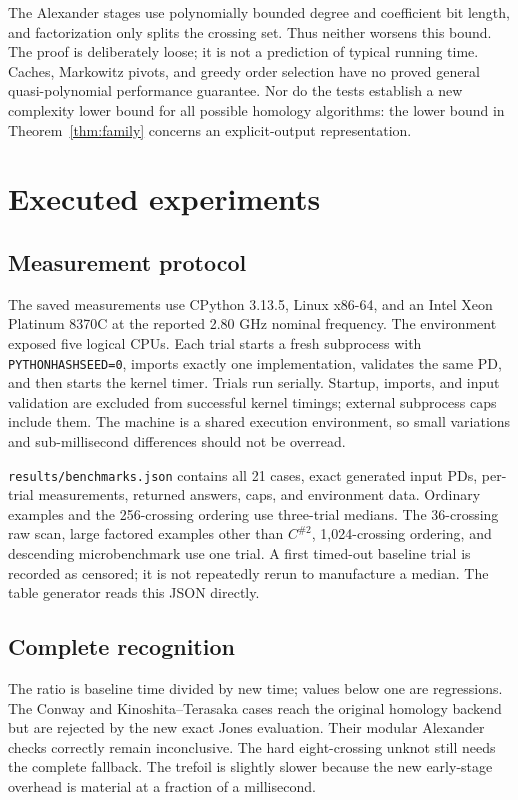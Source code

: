 \documentclass[11pt]{article}
\theoremstyle{definition}\newtheorem{definition}[theorem]{Definition}
\theoremstyle{remark}\newtheorem{remark}[theorem]{Remark}
\begin{document}
The Alexander stages use polynomially bounded degree and coefficient bit
length, and factorization only splits the crossing set. Thus neither worsens
this bound. The proof is deliberately loose; it is not a prediction of typical
running time. Caches, Markowitz pivots, and greedy order selection have no proved
general quasi-polynomial performance guarantee. Nor do the tests establish a
new complexity lower bound for all possible homology algorithms: the lower
bound in Theorem~\ref{thm:family} concerns an explicit-output representation.

\section{Executed experiments}\label{sec:experiments}
\subsection{Measurement protocol}
The saved measurements use CPython 3.13.5, Linux x86-64, and an Intel Xeon
Platinum 8370C at the reported 2.80 GHz nominal frequency. The environment exposed
five logical CPUs. Each trial starts a fresh subprocess with
\texttt{PYTHONHASHSEED=0}, imports exactly one implementation, validates the
same PD, and then starts the kernel timer. Trials run serially. Startup, imports,
and input validation are excluded from successful kernel timings; external
subprocess caps include them. The machine is a shared execution environment,
so small variations and sub-millisecond differences should not be overread.

\texttt{results/benchmarks.json} contains all 21 cases, exact generated input
PDs, per-trial measurements, returned answers, caps, and environment data.
Ordinary examples and the 256-crossing ordering use three-trial medians. The
36-crossing raw scan, large factored examples other than $C^{\#2}$,
1,024-crossing ordering, and descending microbenchmark use one trial.
A first timed-out baseline trial is recorded as censored; it is not repeatedly
rerun to manufacture a median. The table generator reads this JSON directly.

\subsection{Complete recognition}

The ratio is baseline time divided by new time; values below one are
regressions. The Conway and Kinoshita--Terasaka cases reach the original homology
backend but are rejected by the new exact Jones evaluation. Their modular
Alexander checks correctly remain inconclusive. The hard eight-crossing unknot
still needs the complete fallback. The trefoil is slightly slower because the
new early-stage overhead is material at a fraction of a millisecond.
\end{document}
